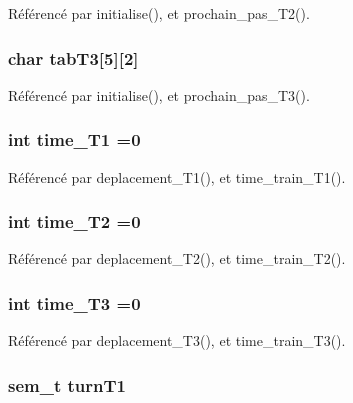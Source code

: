Référencé par initialise(), et prochain\+\_\+pas\+\_\+\+T2().

\subsubsection[{tab\+T3}]{\setlength{\rightskip}{0pt plus 5cm}char tab\+T3[5][2]}\label{thread_8h_aa09683f54909b8bde1c6be7b09283531}


Référencé par initialise(), et prochain\+\_\+pas\+\_\+\+T3().

\subsubsection[{time\+\_\+\+T1}]{\setlength{\rightskip}{0pt plus 5cm}int time\+\_\+\+T1 =0}\label{thread_8h_afbbe5c8bda3844141662fc6b4a61c041}


Référencé par deplacement\+\_\+\+T1(), et time\+\_\+train\+\_\+\+T1().

\subsubsection[{time\+\_\+\+T2}]{\setlength{\rightskip}{0pt plus 5cm}int time\+\_\+\+T2 =0}\label{thread_8h_abfd7eef7b196e27888a949f66e4a20a8}


Référencé par deplacement\+\_\+\+T2(), et time\+\_\+train\+\_\+\+T2().

\subsubsection[{time\+\_\+\+T3}]{\setlength{\rightskip}{0pt plus 5cm}int time\+\_\+\+T3 =0}\label{thread_8h_a1c1f57fea3191ead973c49e64e089547}


Référencé par deplacement\+\_\+\+T3(), et time\+\_\+train\+\_\+\+T3().

\subsubsection[{turn\+T1}]{\setlength{\rightskip}{0pt plus 5cm}sem\+\_\+t turn\+T1}\label{thread_8h_ab70ffd9698f35fd155c00d2f0b4ce5e8}


